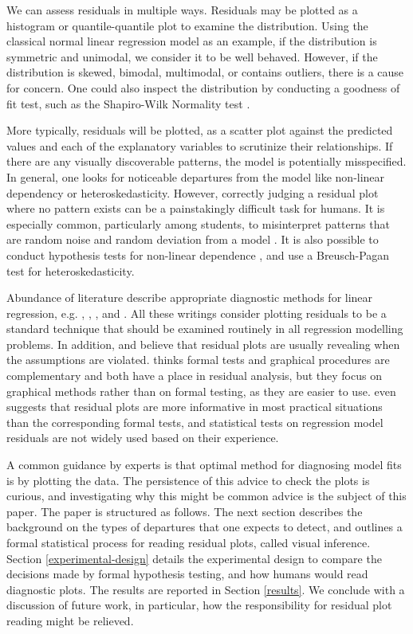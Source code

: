 \documentclass[]{interact}
\theoremstyle{plain}%
\theoremstyle{definition}
\theoremstyle{remark}
\begin{document}
We can assess residuals in multiple ways. Residuals may be plotted as a
histogram or quantile-quantile plot to examine the distribution. Using
the classical normal linear regression model as an example, if the
distribution is symmetric and unimodal, we consider it to be well
behaved. However, if the distribution is skewed, bimodal, multimodal, or
contains outliers, there is a cause for concern. One could also inspect
the distribution by conducting a goodness of fit test, such as the
Shapiro-Wilk Normality test \citep{shapiro1965analysis}.

More typically, residuals will be plotted, as a scatter plot against the
predicted values and each of the explanatory variables to scrutinize
their relationships. If there are any visually discoverable patterns,
the model is potentially misspecified. In general, one looks for
noticeable departures from the model like non-linear dependency or
heteroskedasticity. However, correctly judging a residual plot where no
pattern exists can be a painstakingly difficult task for humans. It is
especially common, particularly among students, to misinterpret patterns
that are random noise and random deviation from a model
\citep{loy2021bringing}. It is also possible to conduct hypothesis tests
for non-linear dependence \citep{ramsey_tests_1969}, and use a
Breusch-Pagan test \citep{breusch_simple_1979} for heteroskedasticity.

Abundance of literature describe appropriate diagnostic methods for
linear regression, e.g. \citet{draper1998applied},
\citet{montgomery1982introduction}, \citet{belsley_regression_1980},
\citet{cook_applied_1999} and \citet{cook1982residuals}. All these
writings consider plotting residuals to be a standard technique that
should be examined routinely in all regression modelling problems. In
addition, \citet{draper1998applied} and \citet{belsley_regression_1980}
believe that residual plots are usually revealing when the assumptions
are violated. \citet{cook_applied_1999} thinks formal tests and
graphical procedures are complementary and both have a place in residual
analysis, but they focus on graphical methods rather than on formal
testing, as they are easier to use. \citet{montgomery1982introduction}
even suggests that residual plots are more informative in most practical
situations than the corresponding formal tests, and statistical tests on
regression model residuals are not widely used based on their
experience.

A common guidance by experts is that optimal method for diagnosing model
fits is by plotting the data. The persistence of this advice to check
the plots is curious, and investigating why this might be common advice
is the subject of this paper. The paper is structured as follows. The
next section describes the background on the types of departures that
one expects to detect, and outlines a formal statistical process for
reading residual plots, called visual inference. Section
\ref{experimental-design} details the experimental design to compare the
decisions made by formal hypothesis testing, and how humans would read
diagnostic plots. The results are reported in Section \ref{results}. We
conclude with a discussion of future work, in particular, how the
responsibility for residual plot reading might be relieved.
\end{document}
